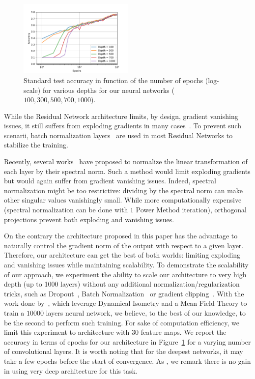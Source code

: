 \begin{figure}[h]
    \centering
    \includegraphics[width=0.5\textwidth]{sections/4_certification/images/final_cifar10_veryverydeep.pdf}
    \caption{Standard test accuracy in function of the number of epochs (log-scale) for various depths for our neural networks ($100,300,500,700,1000$).}
    \label{fig:verydeep}
\end{figure}

While the Residual Network architecture limits, by design, gradient vanishing issues, it still suffers from exploding gradients in many cases~\citep{hayou2021stable}.
To prevent such scenarii, batch normalization layers~\citep{ioffe2015batch} are used in most Residual Networks to stabilize the training.

Recently, several works~\citep{miyato2018spectral,farnia2018generalizable} have proposed to normalize the linear transformation of each layer by their spectral norm.
Such a method would limit exploding gradients but would again suffer from gradient vanishing issues.
Indeed, spectral normalization might be too restrictive: dividing by the spectral norm can make other singular values vanishingly
small.
While more computationally expensive (spectral normalization can be done with $1$ Power Method iteration), orthogonal projections prevent both exploding and vanishing issues. 

On the contrary the architecture proposed in this paper has the advantage to naturally control the gradient norm of the output with respect to a given layer.
Therefore, our architecture can get the best of both worlds: limiting exploding and vanishing issues while maintaining scalability. 
To demonstrate the scalability of our approach, we experiment the ability to scale our architecture to very high depth (up to 1000 layers) without any additional normalization/regularization tricks, such as Dropout~\citep{srivastava2014dropout}, Batch Normalization~\citep{ioffe2015batch} or gradient clipping~\citep{pascanu2013difficulty}.
With the work done by~\cite{xiao2018dynamical}, which leverage Dynamical Isometry and a Mean Field Theory to train a $10000$ layers neural network, we believe, to the best of our knowledge, to be the second to perform such training. 
For sake of computation efficiency, we limit this experiment to architecture with $30$ feature maps.
We report the accuracy in terms of epochs for our architecture in Figure~\ref{fig:verydeep} for a varying number of convolutional layers.
It is worth noting that for the deepest networks, it may take a few epochs before the start of convergence.
As \cite{xiao2018dynamical}, we remark there is no gain in using very deep architecture for this task.


